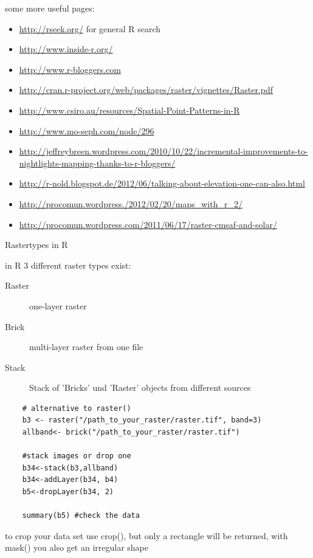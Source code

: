 \begin{frame}

    some more useful pages:
      \begin{footnotesize}
		\begin{itemize}
		  \item \url{http://rseek.org/} for general R search
		  \item \url{http://www.inside-r.org/}
		  \item \url{http://www.r-bloggers.com} 
		  \item \url{http://cran.r-project.org/web/packages/raster/vignettes/Raster.pdf}
		  \item \url{http://www.csiro.au/resources/Spatial-Point-Patterns-in-R}
		  \item \url{http://www.mo-seph.com/node/296}
		  \item \url{http://jeffreybreen.wordpress.com/2010/10/22/incremental-improvements-to-nightlights-mapping-thanks-to-r-bloggers/}
		  \item \url{http://r-nold.blogspot.de/2012/06/talking-about-elevation-one-can-also.html}
		    \item \url{http://procomun.wordpress./2012/02/20/maps_with_r_2/}
		  \item \url{http://procomun.wordpress.com/2011/06/17/raster-cmsaf-and-solar/}
		\end{itemize}
      \end{footnotesize}

\end{frame}



\begin{frame}[fragile]{Rastertypes in R}

    in R 3 different raster types exist:

      \begin{description}
       \item[Raster] one-layer raster
       \item[Brick]  multi-layer raster from one file
       \item[Stack]  Stack of 'Bricks' und 'Raster' objects from different sources
          \end{description}

          \pause \bigskip
          
\begin{lstlisting}
	# alternative to raster()
	b3 <- raster("/path_to_your_raster/raster.tif", band=3)	
	allband<- brick("/path_to_your_raster/raster.tif")
	
	#stack images or drop one
	b34<-stack(b3,allband)
	b34<-addLayer(b34, b4) 
	b5<-dropLayer(b34, 2)

	summary(b5) #check the data
    \end{lstlisting}
    
\bigskip \pause
to crop your data set use crop(), but only a rectangle will be returned, with mask() you also get an irregular shape

\end{frame}

